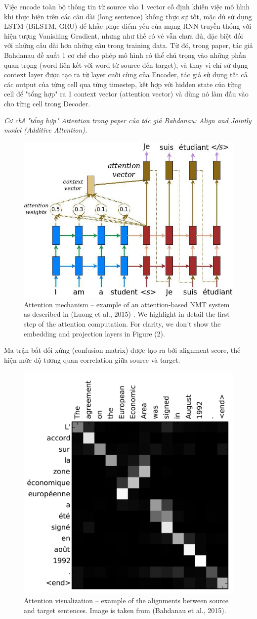 \documentclass[preprint,12pt]{elsarticle}
\begin{document}
Việc encode toàn bộ thông tin từ source vào 1 vector cố định khiến việc mô hình khi thực hiện trên các câu dài (long sentence) không thực sự tốt, mặc dù sử dụng LSTM (BiLSTM, GRU) để khắc phục điểm yếu của mạng RNN truyền thống với hiện tượng Vanishing Gradient, nhưng như thế có vẻ vẫn chưa đủ, đặc biệt đối với những câu dài hơn những câu trong training data. Từ đó, trong paper, tác giả Bahdanau đề xuất 1 cơ chế cho phép mô hình có thể chú trọng vào những phần quan trọng (word liên kết với word từ source đến target), và thay vì chỉ sử dụng context layer được tạo ra từ layer cuối cùng của Encoder, tác giả sử dụng tất cả các output của từng cell qua từng timestep, kết hợp với hidden state của từng cell để "tổng hợp" ra 1 context vector (attention vector) và dùng nó làm đầu vào cho từng cell trong Decoder. 

\emph{Cơ chế "tổng hợp" Attention trong paper của tác giả Bahdanau: Align and Jointly model (Additive Attention).}

\begin{figure}[h]
\centering\includegraphics[width=0.4\linewidth]{img/attention_mechanism.jpg}
\caption{Attention mechanism – example of an attention-based NMT system as described in (Luong et al., 2015) . We highlight in detail the first step of the attention computation. For clarity, we don't show the embedding and projection layers in Figure (2).}
\end{figure}

Ma trận bất đối xứng (confusion matrix) được tạo ra bởi alignment score, thể hiện mức độ tương quan correlation giữa source và target.

\begin{figure}[h]
\centering\includegraphics[width=0.4\linewidth]{img/attention_vis.jpg}
\caption{Attention visualization – example of the alignments between source and target sentences. Image is taken from (Bahdanau et al., 2015).}
\end{figure}
\end{document}
